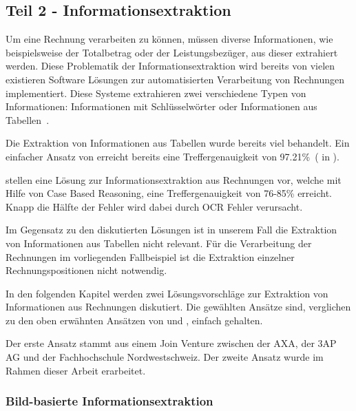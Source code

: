 \subsection{Teil 2 - Informationsextraktion}



Um eine Rechnung verarbeiten zu können, müssen diverse Informationen, wie beispielsweise der Totalbetrag oder der Leistungsbezüger, aus dieser extrahiert werden. Diese Problematik der Informationsextraktion wird bereits von vielen existieren Software Lösungen zur automatisierten Verarbeitung von Rechnungen implementiert. Diese Systeme extrahieren zwei verschiedene Typen von Informationen: Informationen mit Schlüsselwörter oder Informationen aus Tabellen~\autocite{Hamza}.

Die Extraktion von Informationen aus Tabellen wurde bereits viel behandelt. Ein einfacher Ansatz von \textcite{Mandal} erreicht bereits eine Treffergenauigkeit von 97.21\%~(\cite{Mandal} in \cite{Hamza}).

\textcite{Hamza} stellen eine Lösung zur Informationsextraktion aus Rechnungen vor, welche mit Hilfe von Case Based Reasoning, eine Treffergenauigkeit von 76-85\% erreicht. Knapp die Hälfte der Fehler wird dabei durch OCR Fehler verursacht.

Im Gegensatz zu den diskutierten Lösungen ist in unserem Fall die Extraktion von Informationen aus Tabellen nicht relevant. Für die Verarbeitung der Rechnungen im vorliegenden Fallbeispiel ist die Extraktion einzelner Rechnungspositionen nicht notwendig.

In den folgenden Kapitel werden zwei Lösungsvorschläge zur Extraktion von Informationen aus Rechnungen diskutiert. Die gewählten Ansätze sind, verglichen zu den oben erwähnten Ansätzen von \textcite{Mandal} und \textcite{Hamza}, einfach gehalten. 

Der erste Ansatz stammt aus einem Join Venture zwischen der AXA, der 3AP AG und der Fachhochschule Nordwestschweiz. Der zweite Ansatz wurde im Rahmen dieser Arbeit erarbeitet.


\subsubsection{Bild-basierte Informationsextraktion}

